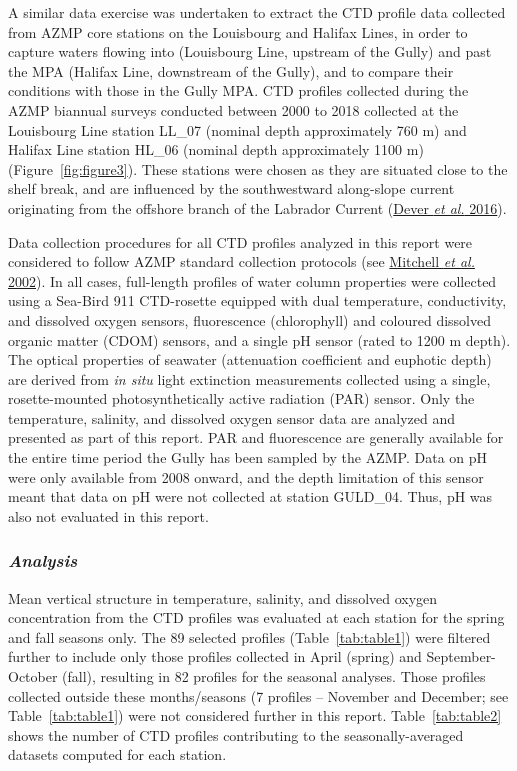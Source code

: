 \documentclass[12pt]{article}\usepackage[]{graphicx}\usepackage[]{color}
\begin{document}
A similar data exercise was undertaken to extract the CTD profile data collected from AZMP core stations on the Louisbourg and Halifax Lines, in order to capture waters flowing into (Louisbourg Line, upstream of the Gully) and past the MPA (Halifax Line, downstream of the Gully), and to compare their conditions with those in the Gully MPA. CTD profiles collected during the AZMP biannual surveys conducted between 2000 to 2018 collected at the Louisbourg Line station LL\_07 (nominal depth approximately 760 m) and Halifax Line station HL\_06 (nominal depth approximately 1100 m) (Figure~\ref{fig:figure3}). These stations were chosen as they are situated close to the shelf break, and are influenced by the southwestward along-slope current originating from the offshore branch of the Labrador Current (\protect\hyperlink{ref-dever_2016}{Dever \textit{et al.} 2016}).

Data collection procedures for all CTD profiles analyzed in this report were considered to follow AZMP standard collection protocols (see \protect\hyperlink{ref-mitchell_2002}{Mitchell \textit{et al.} 2002}). In all cases, full-length profiles of water column properties were collected using a Sea-Bird 911 CTD-rosette equipped with dual temperature, conductivity, and dissolved oxygen sensors, fluorescence (chlorophyll) and coloured dissolved organic matter (CDOM) sensors, and a single pH sensor (rated to 1200 m depth). The optical properties of seawater (attenuation coefficient and euphotic depth) are derived from \emph{in situ} light extinction measurements collected using a single, rosette-mounted photosynthetically active radiation (PAR) sensor. Only the temperature, salinity, and dissolved oxygen sensor data are analyzed and presented as part of this report. PAR and fluorescence are generally available for the entire time period the Gully has been sampled by the AZMP. Data on pH were only available from 2008 onward, and the depth limitation of this sensor meant that data on pH were not collected at station GULD\_04. Thus, pH was also not evaluated in this report.

\hypertarget{analysis}{%
\subsubsection{\texorpdfstring{\emph{Analysis}}{Analysis}}\label{analysis}}

Mean vertical structure in temperature, salinity, and dissolved oxygen concentration from the CTD profiles was evaluated at each station for the spring and fall seasons only. The 89 selected profiles (Table~\ref{tab:table1}) were filtered further to include only those profiles collected in April (spring) and September-October (fall), resulting in 82 profiles for the seasonal analyses. Those profiles collected outside these months/seasons (7 profiles -- November and December; see Table~\ref{tab:table1}) were not considered further in this report. Table~\ref{tab:table2} shows the number of CTD profiles contributing to the seasonally-averaged datasets computed for each station.
\end{document}
